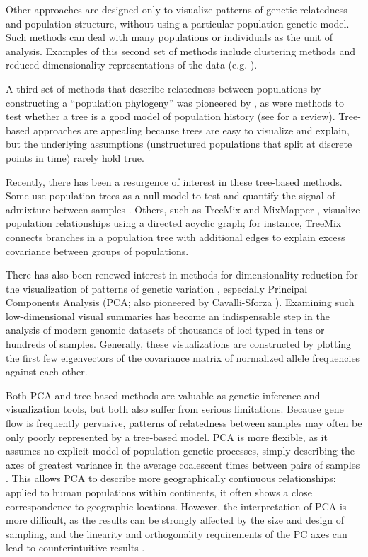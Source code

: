 \documentclass[10pt,letterpaper]{article}
\begin{document}
Other approaches are designed only to visualize patterns of genetic relatedness and population structure,
without using a particular population genetic model.
Such methods can deal with many populations or individuals as the unit of analysis. 
Examples of this second set of methods include clustering methods \cite{STRUCTURE, ADMIXTURE, FINESTRUCTURE} 
and reduced dimensionality representations of the data (e.g. \cite{cavallisforza1994, Patterson2006, price2006eigenstrat}).  

A third set of methods that describe relatedness between populations by constructing a ``population phylogeny''
was pioneered by \cite{cavallisforza_edwards1967}, 
as were methods to test whether a tree is a good model of population history \cite{CavalliSforza1975} (see \cite{Felsenstein1982} for a review).
Tree-based approaches are appealing because trees are easy to visualize and explain,
but the underlying assumptions (unstructured populations that split at discrete points in time)
rarely hold true.

Recently, there has been a resurgence of interest in these tree-based methods.  
Some use population trees as a null model to test and quantify the signal of admixture between samples \cite{reich_india_2009}.  
Others, such as TreeMix \cite{Treemix} and MixMapper \cite{lipson_mixmapper_2013}, 
visualize population relationships using a directed acyclic graph;
for instance, TreeMix connects branches in a population tree with additional edges
to explain excess covariance between groups of populations.

There has also been renewed interest in methods for dimensionality reduction
for the visualization of patterns of genetic variation \cite{Patterson2006},
especially Principal Components Analysis
(PCA; also pioneered by Cavalli-Sforza \cite{menozzi1978synthetic}). 
Examining such low-dimensional visual summaries has become an indispensable step in
the analysis of modern genomic datasets of thousands of loci typed in tens or hundreds of samples.
Generally, these visualizations are constructed by plotting the first few eigenvectors of the covariance matrix
of normalized allele frequencies against each other.

Both PCA and tree-based methods are valuable as genetic inference and visualization tools, but both also suffer from serious limitations.  
Because gene flow is frequently pervasive, patterns of relatedness between samples may often be only poorly represented by a tree-based model.  
PCA is more flexible, as it assumes no explicit model of population-genetic processes, 
simply describing the axes of greatest variance in the average coalescent times between pairs of samples \cite{mcvean_genealogical_2009}. 
This allows PCA to describe more geographically continuous relationships: 
applied to human populations within continents, it often shows a close correspondence to geographic locations\cite{novembre_genes_2008,wang_quantitative_2012}.  
However, the interpretation of PCA is more difficult, as the results can be strongly affected by the size and design of sampling, 
and the linearity and orthogonality requirements of the PC axes can lead to counterintuitive results \cite{novembre_interpreting_2008, Francois_2010_surfing, Frichot2012}.
\end{document}
